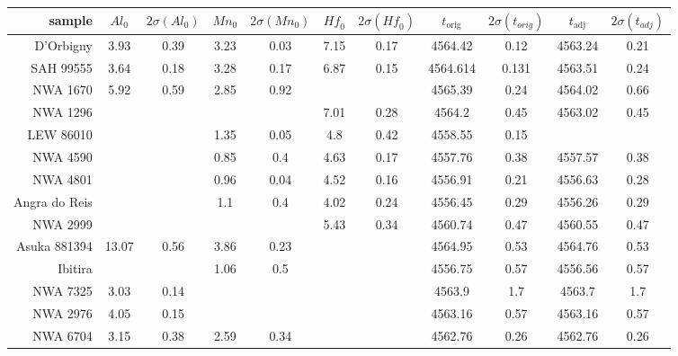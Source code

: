 \documentclass{article}
\begin{document}
\label{tab:desch}
\begin{tabular}{@{}r@{~}|@{~}c@{~}c@{~}c@{~}c@{~}c@{~}c@{~}|@{~}c@{~}c@{~}c@{~}c@{}}
  sample & $\mathit{Al}_0$ & $2\sigma(\mathit{Al}_0)$ &
  $\mathit{Mn}_0$ & $2\sigma(\mathit{Mn}_0)$ &
  $\mathit{Hf}_0$ & $2\sigma(\mathit{Hf}_0)$ &
  $t_{\mbox{orig}}$ & $2\sigma\left(t_{\mathit{orig}}\right)$ &
  $t_{\mbox{adj}}$ & $2\sigma\left(t_{\mathit{adj}}\right)$ \\ \hline
  D'Orbigny & 3.93 &  0.39 & 3.23 & 0.03 & 7.15 & 0.17 & 4564.42 & 0.12 & 4563.24 & 0.21 \\
  SAH 99555 & 3.64 & 0.18 & 3.28 & 0.17 & 6.87 & 0.15 & 4564.614 & 0.131 & 4563.51 & 0.24 \\
  NWA 1670 & 5.92 & 0.59 & 2.85 & 0.92 & & & 4565.39 & 0.24 & 4564.02 & 0.66 \\
  NWA 1296 & & & & & 7.01 & 0.28 & 4564.2 & 0.45 & 4563.02 & 0.45 \\
  LEW 86010 & & & 1.35 & 0.05 & 4.8 & 0.42 & 4558.55 & 0.15 & & \\
  NWA 4590 & & & 0.85 & 0.4 & 4.63 & 0.17 & 4557.76 & 0.38 & 4557.57 & 0.38 \\
  NWA 4801 & & & 0.96 & 0.04 & 4.52 & 0.16 & 4556.91 & 0.21 & 4556.63 & 0.28 \\
  Angra do Reis & & & 1.1 & 0.4 & 4.02 & 0.24 & 4556.45 & 0.29 & 4556.26 & 0.29 \\
  NWA 2999 & & & & & 5.43 & 0.34 & 4560.74 & 0.47 & 4560.55 & 0.47 \\
  Asuka 881394 & 13.07 & 0.56 & 3.86 & 0.23 & & & 4564.95 & 0.53 & 4564.76 & 0.53 \\
  Ibitira & & & 1.06 & 0.5 & & & 4556.75 & 0.57 & 4556.56 & 0.57 \\
  NWA 7325 & 3.03 & 0.14 & & & & & 4563.9 & 1.7 & 4563.7 & 1.7 \\
  NWA 2976 & 4.05 & 0.15 & & & & & 4563.16 & 0.57 & 4563.16 & 0.57 \\
  NWA 6704 & 3.15 & 0.38 & 2.59 & 0.34 & & & 4562.76 & 0.26 & 4562.76 & 0.26\\
\end{tabular}\medskip
\end{document}
